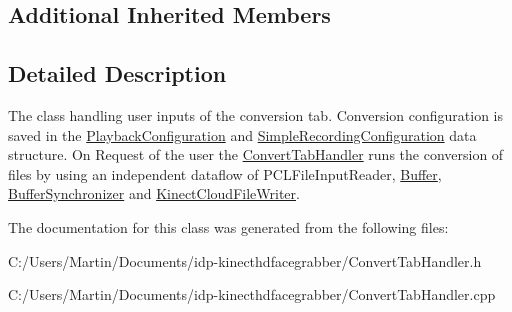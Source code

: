 \subsection*{Additional Inherited Members}


\subsection{Detailed Description}
The class handling user inputs of the conversion tab. Conversion configuration is saved in the \hyperlink{class_playback_configuration}{Playback\+Configuration} and \hyperlink{class_simple_recording_configuration}{Simple\+Recording\+Configuration} data structure. On Request of the user the \hyperlink{class_convert_tab_handler}{Convert\+Tab\+Handler} runs the conversion of files by using an independent dataflow of P\+C\+L\+File\+Input\+Reader, \hyperlink{class_buffer}{Buffer}, \hyperlink{class_buffer_synchronizer}{Buffer\+Synchronizer} and \hyperlink{class_kinect_cloud_file_writer}{Kinect\+Cloud\+File\+Writer}. 

The documentation for this class was generated from the following files\+:\begin{DoxyCompactItemize}
\item 
C\+:/\+Users/\+Martin/\+Documents/idp-\/kinecthdfacegrabber/Convert\+Tab\+Handler.\+h\item 
C\+:/\+Users/\+Martin/\+Documents/idp-\/kinecthdfacegrabber/Convert\+Tab\+Handler.\+cpp\end{DoxyCompactItemize}
